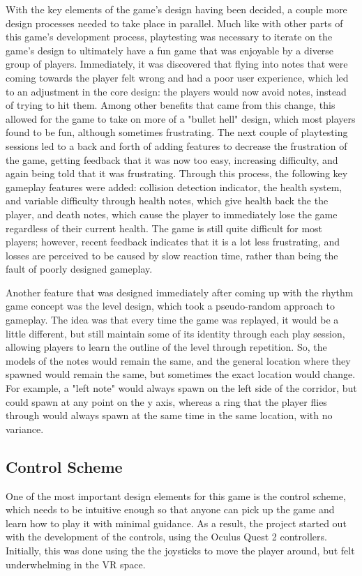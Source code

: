 \documentclass[10pt,twocolumn]{article}
\begin{document}
With the key elements of the game's design having been decided, a couple more design processes needed to take place in parallel. Much like with other parts of this game's development process, playtesting was necessary to iterate on the game's design to ultimately have a fun game that was enjoyable by a diverse group of players. Immediately, it was discovered that flying into notes that were coming towards the player felt wrong and had a poor user experience, which led to an adjustment in the core design: the players would now avoid notes, instead of trying to hit them. Among other benefits that came from this change, this allowed for the game to take on more of a "bullet hell" design, which most players found to be fun, although sometimes frustrating. The next couple of playtesting sessions led to a back and forth of adding features to decrease the frustration of the game, getting feedback that it was now too easy, increasing difficulty, and again being told that it was frustrating. Through this process, the following key gameplay features were added: collision detection indicator, the health system, and variable difficulty through health notes, which give health back the the player, and death notes, which cause the player to immediately lose the game regardless of their current health. The game is still quite difficult for most players; however, recent feedback indicates that it is a lot less frustrating, and losses are perceived to be caused by slow reaction time, rather than being the fault of poorly designed gameplay.

Another feature that was designed immediately after coming up with the rhythm game concept was the level design, which took a pseudo-random approach to gameplay. The idea was that every time the game was replayed, it would be a little different, but still maintain some of its identity through each play session, allowing players to learn the outline of the level through repetition. So, the models of the notes would remain the same, and the general location where they spawned would remain the same, but sometimes the exact location would change. For example, a "left note" would always spawn on the left side of the corridor, but could spawn at any point on the y axis, whereas a ring that the player flies through would always spawn at the same time in the same location, with no variance.

\subsection{Control Scheme}
One of the most important design elements for this game is the control scheme, which needs to be intuitive enough so that anyone can pick up the game and learn how to play it with minimal guidance. As a result, the project started out with the development of the controls, using the Oculus Quest 2 controllers. Initially, this was done using the the joysticks to move the player around, but felt underwhelming in the VR space.
\end{document}
